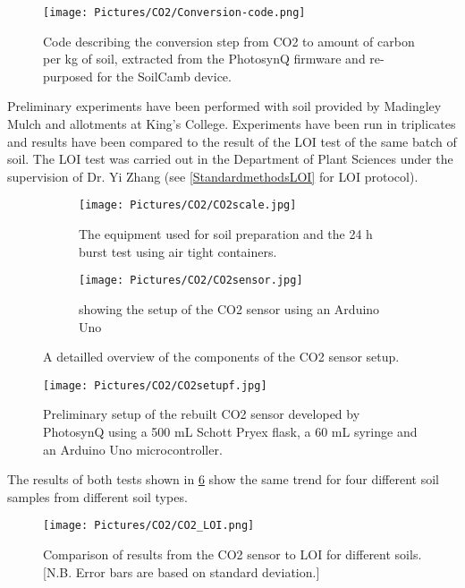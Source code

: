 \begin{figure}[h]
\centering
\texttt{[image: Pictures/CO2/Conversion-code.png]} 
\caption{Code describing the conversion step from \gls{CO2} to amount of carbon per kg of soil, extracted from the PhotosynQ firmware and re-purposed for the SoilCamb device.}
\label{fig:conversion-code}
\end{figure}

Preliminary experiments have been performed with soil provided by Madingley Mulch and allotments at King's College. Experiments have been run in triplicates and results have been compared to the result of the \gls{LOI} test of the same batch of soil. The \gls{LOI} test was carried out in the Department of Plant Sciences under the supervision of Dr. Yi Zhang (see \cref{StandardmethodsLOI} for \gls{LOI} protocol).

\begin{figure}[h]
    \centering
    \begin{subfigure}[b]{0.48\linewidth}        %
        \centering
        \texttt{[image: Pictures/CO2/CO2scale.jpg]}
        \caption{The equipment used for soil preparation and the 24 h burst test using air tight containers.}
        \label{fig:SetupA}
    \end{subfigure}
    \begin{subfigure}[b]{0.48\linewidth}        %
        \centering
        \texttt{[image: Pictures/CO2/CO2sensor.jpg]}
        \caption{showing the setup of the \gls{CO2} sensor using an Arduino Uno}
        \label{fig:SetupB}
    \end{subfigure}
    \caption{A detailled overview of the components of the \gls{CO2} sensor setup.}
    \label{fig:SetupDetailled}
\end{figure}


\begin{figure}[h!]
\centering
\texttt{[image: Pictures/CO2/CO2setupf.jpg]} 
\caption{Preliminary setup of the rebuilt \gls{CO2} sensor developed by PhotosynQ using a 500 mL Schott Pryex flask, a 60 mL syringe and an Arduino Uno microcontroller.}
\label{fig:CO2_setup}
\end{figure}

The results of both tests  shown in \cref{fig:CO2_LOI} show the same trend for four different soil samples from different soil types. 


\begin{figure}[h!]
    \centering
    \texttt{[image: Pictures/CO2/CO2\_LOI.png]}
    \caption{Comparison of results from the \gls{CO2} sensor to \gls{LOI} for different soils. \small[N.B. Error bars are based on standard deviation.]}
    \label{fig:CO2_LOI}
\end{figure}

